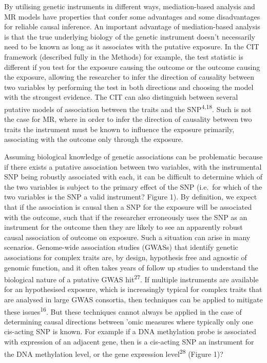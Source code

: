 \documentclass[]{article}
\begin{document}
By utilising genetic instruments in different ways, mediation-based
analysis and MR models have properties that confer some advantages and
some disadvantages for reliable causal inference. An important advantage
of mediation-based analysis is that the true underlying biology of the
genetic instrument doesn't necessarily need to be known as long as it
associates with the putative exposure. In the CIT framework (described
fully in the Methods) for example, the test statistic is different if
you test for the exposure causing the outcome or the outcome causing the
exposure, allowing the researcher to infer the direction of causality
between two variables by performing the test in both directions and
choosing the model with the strongest evidence. The CIT can also
distinguish between several putative models of association between the
traits and the SNP\textsuperscript{4,18}. Such is not the case for MR,
where in order to infer the direction of causality between two traits
the instrument must be known to influence the exposure primarily,
associating with the outcome only through the exposure.

Assuming biological knowledge of genetic associations can be problematic
because if there exists a putative association between two variables,
with the instrumental SNP being robustly associated with each, it can be
difficult to determine which of the two variables is subject to the
primary effect of the SNP (i.e.~for which of the two variables is the
SNP a valid instrument? Figure 1). By definition, we expect that if the
association is causal then a SNP for the exposure will be associated
with the outcome, such that if the researcher erroneously uses the SNP
as an instrument for the outcome then they are likely to see an
apparently robust causal association of outcome on exposure. Such a
situation can arise in many scenarios. Genome-wide association studies
(GWASs) that identify genetic associations for complex traits are, by
design, hypothesis free and agnostic of genomic function, and it often
takes years of follow up studies to understand the biological nature of
a putative GWAS hit\textsuperscript{27}. If multiple instruments are
available for an hypothesised exposure, which is increasingly typical
for complex traits that are analysed in large GWAS consortia, then
techniques can be applied to mitigate these issues\textsuperscript{16}.
But these techniques cannot always be applied in the case of determining
causal directions between 'omic measures where typically only one
cis-acting SNP is known. For example if a DNA methylation probe is
associated with expression of an adjacent gene, then is a cis-acting SNP
an instrument for the DNA methylation level, or the gene expression
level\textsuperscript{28} (Figure 1)?
\end{document}
